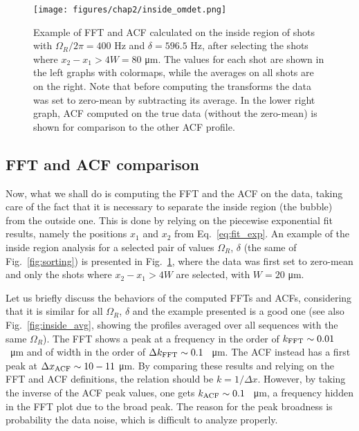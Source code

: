 \begin{figure}[ht!]
    \centering
    \texttt{[image: figures/chap2/inside\_omdet.png]}
    \caption{Example of FFT and ACF calculated on the inside region of shots with $\Omega_R/2\pi = 400$ \unit{\hertz} and $\delta = 596.5$ \unit{\hertz}, after selecting the shots where $x_2-x_1 > 4W = 80$ \unit{\micro\meter}. The values for each shot are shown in the left graphs with colormaps, while the averages on all shots are on the right. Note that before computing the transforms the data was set to zero-mean by subtracting its average. In the lower right graph, ACF computed on the true data (without the zero-mean) is shown for comparison to the other ACF profile.}
    \label{fig:inside_00}
\end{figure}

\subsection{FFT and ACF comparison}
Now, what we shall do is computing the FFT and the ACF on the data, taking care of the fact that it is necessary to separate the inside region (the bubble) from the outside one. This is done by relying on the piecewise exponential fit results, namely the positions $x_1$ and $x_2$ from Eq.\ \eqref{eq:fit_exp}.
An example of the inside region analysis for a selected pair of values $\Omega_R$, $\delta$ (the same of Fig.\ \ref{fig:sorting}) is presented in Fig.\ \ref{fig:inside_00}, where the data was first set to zero-mean and only the shots where $x_2-x_1 > 4W$ are selected, with $W = 20$ \unit{\micro\meter}. 

Let us briefly discuss the behaviors of the computed FFTs and ACFs, considering that it is similar for all $\Omega_R$, $\delta$ and the example presented is a good one (see also Fig.\ \ref{fig:inside_avg}, showing the profiles averaged over all sequences with the same $\Omega_R$). The FFT shows a peak at a frequency in the order of $k_{\rm FFT} \sim 0.01$ \unit{\per\micro\meter} and of width in the order of $\Delta k_{\rm FFT} \sim 0.1$ \unit{\per\micro\meter}. The ACF instead has a first peak at $\Delta x_{\rm ACF} \sim 10-11$ \unit{\micro\meter}. By comparing these results and relying on the FFT and ACF definitions, the relation should be $k = 1/\Delta x$. However, by taking the inverse of the ACF peak values, one gets $k_{\rm ACF} \sim 0.1$ \unit{\per\micro\meter}, a frequency hidden in the FFT plot due to the broad peak. The reason for the peak broadness is probability the data noise, which is difficult to analyze properly. 


